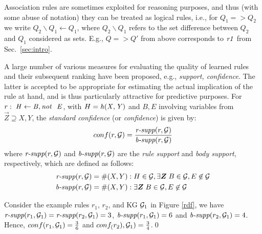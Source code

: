 Association rules are sometimes exploited for reasoning purposes, and thus (with some abuse of notation) they can be treated as logical rules, i.e., for $Q_1=>Q_2$ we write $Q_2\backslash Q_1 \leftarrow Q_1$, where $Q_2 \backslash Q_1$ refers to the set difference between $Q_2$ and $Q_1$ considered as sets. E.g., $Q=>Q'$ from above corresponds to $\mathit{r1}$ from Sec.~\ref{sec:intro}.

A large number of various measures for evaluating the quality of learned rules and their subsequent ranking have been proposed, e.g., \emph{support, confidence}. The latter is accepted to be appropriate for estimating the actual implication of the rule at hand, and is thus particularly attractive for predictive purposes. For $r:\;\mathit{H\leftarrow B, \mathit{not}~ \ E}$, with $H=\mathit{h(X,Y)}$ and $B,E$ involving variables from $\vec{Z}\supseteq X,Y$, the \emph{standard confidence} (or \textit{confidence}) is given by:
\vspace{-.26cm}
\begin{align*}
conf(r,\mathcal{G})= \frac{\textit{r-supp}(r,\mathcal{G})}{\textit{b-supp}(r,\mathcal{G})}
\end{align*}
where $\textit{r-supp}(r,\mathcal{G})$ and $\textit{b-supp}(r ,\mathcal{G})$ are the \textit{rule support} and \textit{body support}, respectively, which are defined as follows:
\begin{align*}
\textit{r-supp}(r,\cG) &= \#(X,Y): H \in \cG, \exists \vec{Z}\;B\in \cG,E \not \in \cG\\
\textit{b-supp}(r,\cG) &= \#(X,Y):\exists \vec{Z}\; B\in \cG, E \not \in \cG
\end{align*}
\begin{example}
Consider the example rules $r_1$, $r_2$, and KG $\mathcal{G}_1$ in Figure \ref{rdf}, we have $\textit{r-supp}(r_1,\mathcal{G}_1) = \textit{r-supp}(r_2,\mathcal{G}_1) = 3$, $\textit{b-supp}(r_1,\mathcal{G}_1) = 6$ and $\textit{b-supp}(r_2,\mathcal{G}_1) = 4$.
Hence, $conf(r_1,\mathcal{G}_1) = \frac{3}{6}$ and $conf_(r_2),\mathcal{G}_1) = \frac{3}{4}$.\qed
\end{example}

